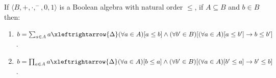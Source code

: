 If $\langle B, +, \cdot, ^-, 0, 1 \rangle$ is a Boolean algebra with natural order $\leq$, if $A \subseteq B$ and $b \in B$ then:
\begin{enumerate}
\item $b = \sum_{a \in A} a \xleftrightarrow{\Delta} (\forall a \in A)[a \leq b] \land (\forall b' \in B)[(\forall a \in A)[a \leq b'] \rightarrow b \leq b']$.
\item $b = \prod_{a \in A} a \xleftrightarrow{\Delta} (\forall a \in A)[b \leq a] \land (\forall b' \in B)[(\forall a \in A)[b' \leq a] \rightarrow b' \leq b]$.
\end{enumerate}
